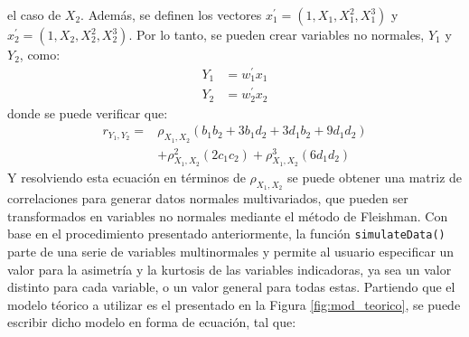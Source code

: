 \documentclass[
  english]{revcoles}
\begin{document}
el caso de \(X_2\). Además, se definen los vectores
\(x_1^\prime = (1, X_1, X_1^2, X_1^3)\) y
\(x_2^\prime = (1, X_2, X_2^2, X_2^3)\). Por lo tanto, se pueden crear
variables no normales, \(Y_1\) y \(Y_2\), como: \begin{align*}
  Y_1 & = w_1^\prime x_1 \\
  Y_2 & = w_2^\prime x_2
\end{align*} donde se puede verificar que: \begin{align*}
  r_{Y_1, Y_2} = & \rho_{X_1, X_2} (b_1 b_2 + 3b_1 d_2 + 3d_1 b_2 + 9 d_1 d_2) \\
  & + \rho_{X_1, X_2}^2 (2 c_1 c_2) + \rho_{X_1, X_2}^3 (6 d_1 d_2)
\end{align*} Y resolviendo esta ecuación en términos de
\(\rho_{X_1, X_2}\) se puede obtener una matriz de correlaciones para
generar datos normales multivariados, que pueden ser transformados en
variables no normales mediante el método de Fleishman. Con base en el
procedimiento presentado anteriormente, la función
\texttt{simulateData()} parte de una serie de variables multinormales y
permite al usuario especificar un valor para la asimetría y la kurtosis
de las variables indicadoras, ya sea un valor distinto para cada
variable, o un valor general para todas estas. Partiendo que el modelo
téorico a utilizar es el presentado en la Figura \ref{fig:mod_teorico},
se puede escribir dicho modelo en forma de ecuación, tal que:
\end{document}
